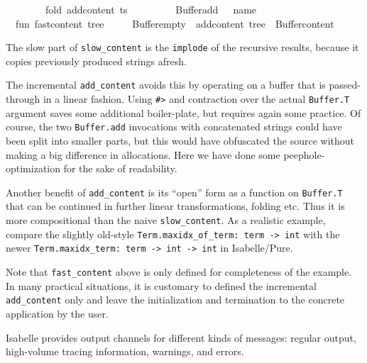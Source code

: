 \begin{isabellebody}
\ \ \ \ \ \ \ \ fold\ add{\isacharunderscore}content\ ts\ {\isacharhash}{\isachargreater}\isanewline
\ \ \ \ \ \ \ \ Buffer{\isachardot}add\ {\isacharparenleft}{\isachardoublequote}{\isacharless}{\isacharslash}{\isachardoublequote}\ {\isacharcircum}\ name\ {\isacharcircum}\ {\isachardoublequote}{\isachargreater}{\isachardoublequote}{\isacharparenright}{\isacharsemicolon}\isanewline
\isanewline
\ \ fun\ fast{\isacharunderscore}content\ tree\ {\isacharequal}\isanewline
\ \ \ \ Buffer{\isachardot}empty\ {\isacharbar}{\isachargreater}\ add{\isacharunderscore}content\ tree\ {\isacharbar}{\isachargreater}\ Buffer{\isachardot}content{\isacharsemicolon}\isanewline
{\isacharverbatimclose}%
\endisatagML
{\isafoldML}%
%
\isadelimML
%
\endisadelimML
%
\begin{isamarkuptext}%
The slow part of \verb|slow_content| is the \verb|implode| of
  the recursive results, because it copies previously produced strings
  afresh.

  The incremental \verb|add_content| avoids this by operating on a
  buffer that is passed-through in a linear fashion.  Using \verb|#>| and contraction over the actual \verb|Buffer.T| argument
  saves some additional boiler-plate, but requires again some
  practice.  Of course, the two \verb|Buffer.add| invocations with
  concatenated strings could have been split into smaller parts, but
  this would have obfuscated the source without making a big
  difference in allocations.  Here we have done some
  peephole-optimization for the sake of readability.

  Another benefit of \verb|add_content| is its ``open'' form as a
  function on \verb|Buffer.T| that can be continued in further
  linear transformations, folding etc.  Thus it is more compositional
  than the naive \verb|slow_content|.  As a realistic example, compare
  the slightly old-style \verb|Term.maxidx_of_term: term -> int| with
  the newer \verb|Term.maxidx_term: term -> int -> int| in
  Isabelle/Pure.

  Note that \verb|fast_content| above is only defined for completeness
  of the example.  In many practical situations, it is customary to
  defined the incremental \verb|add_content| only and leave the
  initialization and termination to the concrete application by the
  user.%
\end{isamarkuptext}%
\isamarkuptrue%
%
\isamarkuptrue%
%
\begin{isamarkuptext}%
Isabelle provides output channels for different kinds of
  messages: regular output, high-volume tracing information, warnings,
  and errors.


\end{isamarkuptext}
\end{isabellebody}

